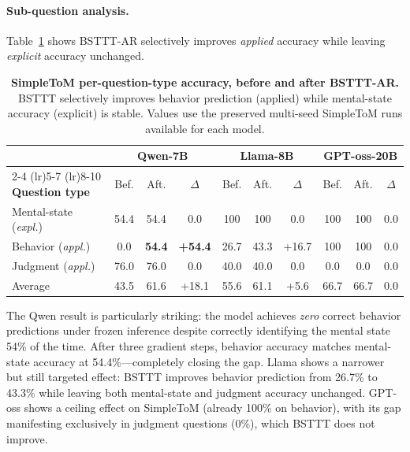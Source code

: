 \paragraph{Sub-question analysis.}
Table~\ref{tab:simpletom_subtypes} shows BSTTT-AR selectively improves \emph{applied} accuracy while leaving \emph{explicit} accuracy unchanged.

\begin{table}[t]
    \caption{\textbf{SimpleToM per-question-type accuracy, before and after BSTTT-AR.}
    BSTTT selectively improves behavior prediction (applied) while mental-state accuracy (explicit) is stable.
    Values use the preserved multi-seed SimpleToM runs available for each model.}
    \label{tab:simpletom_subtypes}
    \centering
    \small
    \begin{tabular}{@{}l ccc ccc ccc @{}}
        \toprule
        & \multicolumn{3}{c}{\textbf{Qwen-7B}} & \multicolumn{3}{c}{\textbf{Llama-8B}} & \multicolumn{3}{c}{\textbf{GPT-oss-20B}} \\
        \cmidrule(lr){2-4} \cmidrule(lr){5-7} \cmidrule(lr){8-10}
        \textbf{Question type} & Bef. & Aft. & $\Delta$ & Bef. & Aft. & $\Delta$ & Bef. & Aft. & $\Delta$ \\
        \midrule
        Mental-state (\emph{expl.}) & 54.4 & 54.4 & 0.0 & 100 & 100 & 0.0 & 100 & 100 & 0.0 \\
        Behavior (\emph{appl.})     & 0.0 & \textbf{54.4} & \textbf{+54.4} & 26.7 & 43.3 & +16.7 & 100 & 100 & 0.0 \\
        Judgment (\emph{appl.})     & 76.0 & 76.0 & 0.0 & 40.0 & 40.0 & 0.0 & 0.0 & 0.0 & 0.0 \\
        \midrule
        Average & 43.5 & 61.6 & +18.1 & 55.6 & 61.1 & +5.6 & 66.7 & 66.7 & 0.0 \\
        \bottomrule
    \end{tabular}
\end{table}

The Qwen result is particularly striking: the model achieves \emph{zero} correct behavior predictions under frozen inference despite correctly identifying the mental state 54\% of the time.
After three gradient steps, behavior accuracy matches mental-state accuracy at 54.4\%---completely closing the gap.
Llama shows a narrower but still targeted effect: BSTTT improves behavior prediction from 26.7\% to 43.3\% while leaving both mental-state and judgment accuracy unchanged.
GPT-oss shows a ceiling effect on SimpleToM (already 100\% on behavior), with its gap manifesting exclusively in judgment questions (0\%), which BSTTT does not improve.

